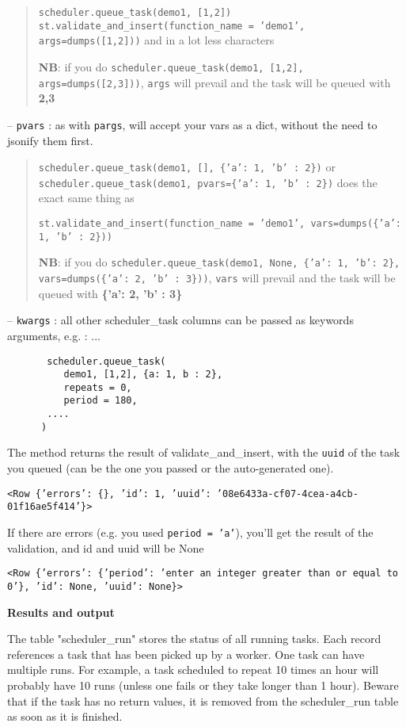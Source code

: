 \documentclass[justified,sixbynine,notoc]{tufte-book}
\def\ft{\small\tt}
\begin{document}
\begin{fullwidth}
\begin{quote}{\ft scheduler.queue\_task(demo1, [1,2])}
{\ft st.validate\_and\_insert(function\_name = 'demo1', args=dumps([1,2]))}
\noindent and in a lot less characters

{\bf NB}: if you do {\ft scheduler.queue\_task(demo1, [1,2], args=dumps([2,3]))}, {\ft args} will prevail and the task will be queued with {\bf 2,3}\end{quote}-- {\ft pvars} : as with {\ft pargs}, will accept your vars as a dict, without the need to jsonify them first.
\begin{quote}{\ft scheduler.queue\_task(demo1, [], \{'a': 1, 'b' : 2\})} or {\ft scheduler.queue\_task(demo1, pvars=\{'a': 1, 'b' : 2\})}
\noindent does the exact same thing as

{\ft st.validate\_and\_insert(function\_name = 'demo1', vars=dumps(\{'a': 1, 'b' : 2\}))}

{\bf NB}:  if you do {\ft scheduler.queue\_task(demo1, None, \{'a': 1, 'b': 2\}, vars=dumps(\{'a': 2, 'b' : 3\}))}, {\ft vars} will prevail and the task will be queued with {\bf \{'a': 2, 'b' : 3\}}\end{quote}-- {\ft kwargs} : all other scheduler\_task columns can be passed as keywords arguments, e.g. :
... \begin{lstlisting}
       scheduler.queue_task(
          demo1, [1,2], {a: 1, b : 2},
          repeats = 0,
          period = 180,
       ....
      )
\end{lstlisting}

The method returns the result of validate\_and\_insert, with the {\ft uuid} of the task you queued (can be the one you passed or the auto-generated one).

{\ft <Row \{'errors': \{\}, 'id': 1, 'uuid': '08e6433a-cf07-4cea-a4cb-01f16ae5f414'\}>}

If there are errors (e.g. you used {\ft period = 'a'}), you'll get the result of the validation, and id and uuid will be None

{\ft <Row \{'errors': \{'period': 'enter an integer greater than or equal to 0'\}, 'id': None, 'uuid': None\}>}

{\bf Results and output}

The table "scheduler\_run" stores the status of all running tasks. Each record references a task that has been picked up by a worker.  One task can have multiple runs. For example, a task scheduled to repeat 10 times an hour will probably have 10 runs (unless one fails or they take longer than 1 hour). Beware that if the task has no return values, it is removed from the scheduler\_run table as soon as it is finished.


\end{fullwidth}
\end{document}

